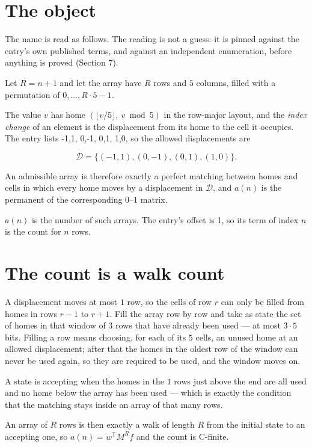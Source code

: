 \documentclass[11pt]{article}
\theoremstyle{definition}
\begin{document}
\section{The object}

The name is read as follows. The reading is not a guess: it is pinned against the entry's own published terms, and against an independent enumeration, before anything is proved (Section 7).

Let $R = n + 1$ and let the array have $R$ rows and $5$ columns, filled with a permutation of $0,\dots,R\cdot5-1$.

The value $v$ has home $(\lfloor v/5\rfloor,\ v \bmod 5)$ in the row-major layout, and the {\itshape index change} of an element is the displacement from its home to the cell it occupies. The entry lists -1,1, 0,-1, 0,1, 1,0, so the allowed displacements are

\[\mathcal{D} = \{(-1,1), (0,-1), (0,1), (1,0)\}.\]

An admissible array is therefore exactly a perfect matching between homes and cells in which every home moves by a displacement in $\mathcal{D}$, and $a(n)$ is the permanent of the corresponding $0$--$1$ matrix.

$a(n)$ is the number of such arrays. The entry's offset is 1, so its term of index $n$ is the count for $n$ rows.

\section{The count is a walk count}

A displacement moves at most $1$ row, so the cells of row $r$ can only be filled from homes in rows $r-1$ to $r+1$. Fill the array row by row and take as state the set of homes in that window of $3$ rows that have already been used --- at most $3\cdot5$ bits. Filling a row means choosing, for each of its $5$ cells, an unused home at an allowed displacement; after that the homes in the oldest row of the window can never be used again, so they are required to be used, and the window moves on.

A state is accepting when the homes in the $1$ rows just above the end are all used and no home below the array has been used --- which is exactly the condition that the matching stays inside an array of that many rows.

An array of $R$ rows is then exactly a walk of length $R$ from the initial state to an accepting one, so $a(n) = w^{\mathsf T}M^{R}f$ and the count is C-finite.
\end{document}
